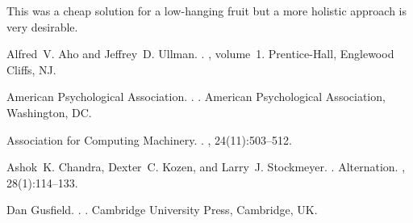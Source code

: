 \documentclass[a4paper,11pt]{article}
\begin{document}
This was a cheap solution for a low-hanging fruit but a more holistic approach
is very desirable.




%


%

\begin{thebibliography}{}

Alfred~V. Aho and Jeffrey~D. Ullman.
.
, volume~1.
\newblock Prentice-{Hall}, Englewood Cliffs, NJ.

{American Psychological Association}.
.
.
\newblock American Psychological Association, Washington, DC.

{Association for Computing Machinery}.
.
, 24(11):503--512.

Ashok~K. Chandra, Dexter~C. Kozen, and Larry~J. Stockmeyer.
.
\newblock Alternation.
,
  28(1):114--133.

Dan Gusfield.
.
.
\newblock Cambridge University Press, Cambridge, UK.

\end{thebibliography}
\end{document}
